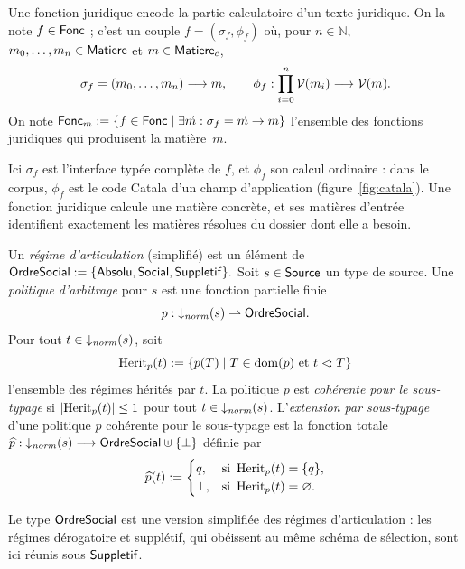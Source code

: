 \documentclass[review]{jflart}
\begin{document}
\begin{defi}\label{def:rule-package}
Une fonction juridique encode la partie calculatoire d'un texte juridique. On
la note \(f\in\mathsf{Fonc}\) ; c'est un couple \(f=(\sigma_f,\phi_f)\) où, pour
\(n\in\mathbb N\), \(m_0,\ldots,m_n\in\mathsf{Matiere}\) et \(m\in\mathsf{Matiere}_c\),
\[
 \sigma_f=(m_0,\ldots,m_n)\longrightarrow m,
 \qquad
 \phi_f:\prod_{i=0}^{n}\mathcal{V}(m_i)\longrightarrow\mathcal{V}(m).
\]
On note \(\mathsf{Fonc}_m:=\{f\in\mathsf{Fonc}\mid\exists \vec m:\sigma_f=\vec m\to m\}\)
l'ensemble des fonctions juridiques qui produisent la matière~\(m\).
\end{defi}

Ici \(\sigma_f\) est l'interface typée complète de \(f\), et \(\phi_f\) son
calcul ordinaire : dans le corpus, \(\phi_f\) est le code Catala d'un champ
d'application (figure~\ref{fig:catala}). Une fonction juridique calcule une
matière concrète, et ses matières d'entrée identifient exactement les matières
résolues du dossier dont elle a besoin.

\begin{defi}\label{def:arbitration-policy}
Un \emph{régime d'articulation} (simplifié) est un élément de
\(
\mathsf{OrdreSocial}:= \{\mathsf{Absolu}, \mathsf{Social}, \mathsf{Suppletif}\}.
\)
Soit \(s \in \mathsf{Source}\) un type de source. Une \emph{politique d'arbitrage} pour
\(s\) est une fonction partielle finie
\[
  p :
  \mathop{\downarrow_{\mathit{norm}}}(s)
  \rightharpoonup
  \mathsf{OrdreSocial} .
\]
Pour tout \(t \in \mathop{\downarrow_{\mathit{norm}}}(s)\), soit
\[
  \operatorname{Herit}_{p}(t)
  :=
  \left\{
    p(T)
    \;\middle|\;
    T \in \operatorname{dom}(p)
    \text{ et }
    t \mathrel{<\!:} T
  \right\}
\]
l'ensemble des régimes hérités par \(t\). La politique \(p\) est
\emph{cohérente pour le sous-typage} si
\(
  \left|\operatorname{Herit}_{p}(t)\right| \leq 1
\)
pour tout \(t \in \mathop{\downarrow_{\mathit{norm}}}(s)\).
L'\emph{extension par sous-typage} d'une politique \(p\) cohérente pour le
sous-typage est la fonction totale
\(
  \widehat{p} :
  \mathop{\downarrow_{\mathit{norm}}}(s)
  \longrightarrow
  \mathsf{OrdreSocial} \uplus \{\bot\}
\)
définie par
\[
  \widehat{p}(t)
  :=
  \begin{cases}
        q,
      & \text{si } \operatorname{Herit}_{p}(t)=\{q\},\\
    \bot,
      & \text{si } \operatorname{Herit}_{p}(t)=\varnothing.
  \end{cases}
\]
\end{defi}

Le type \(\mathsf{OrdreSocial}\) est une version simplifiée des régimes d'articulation : les
régimes dérogatoire et supplétif, qui obéissent au même schéma de sélection,
sont ici réunis sous \(\mathsf{Suppletif}\).
\end{document}
